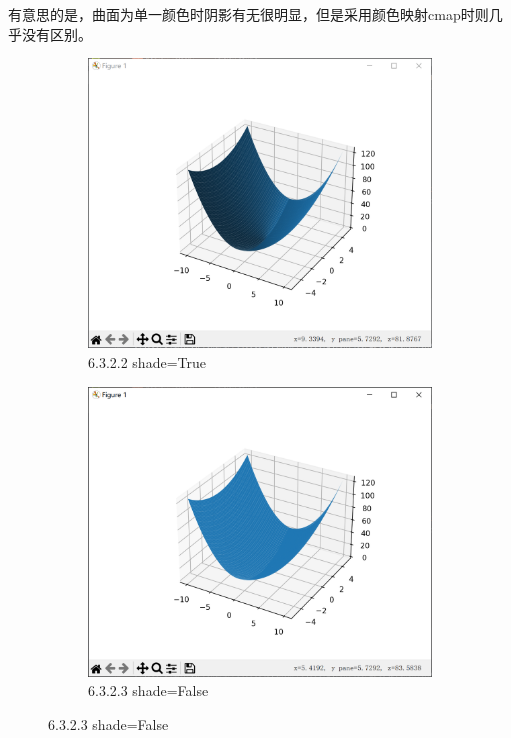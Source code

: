 \documentclass[12pt]{article}
\begin{document}
有意思的是，曲面为单一颜色时阴影有无很明显，但是采用颜色映射cmap时则几乎没有区别。
\begin{figure}[H]
    \centering
    \begin{subfigure}[b]{0.4\textwidth}
        \includegraphics[width=\textwidth]{3D 曲面图 shade Pic1.png} %
        \caption{6.3.2.2 shade=True}
        \label{fig:line-graph2}
    \end{subfigure}
    \hfill
    \begin{subfigure}[b]{0.4\textwidth}
        \includegraphics[width=\textwidth]{3D 曲面图 shade Pic2.png} %
        \caption{6.3.2.3 shade=False}
        \label{fig:line-graph2-pic2}
    \end{subfigure}
\end{figure}
\newpage
\end{document}

